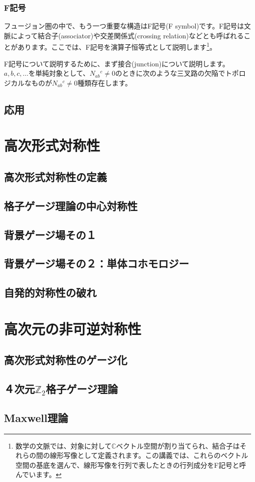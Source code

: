 \documentclass[report,paper=a4, fontsize=12pt, line_length=16cm, number_of_lines=33,dvipdfmx]{jlreq}
\numberwithin{equation}{chapter}
\newcommand{\Cb}{\mathbb{C}}
\newcommand{\Ztwo}{\mbox{$\mathbb{Z}_{2}$}}
\begin{document}
\subsection{F記号}
フュージョン圏の中で、もう一つ重要な構造はF記号(F symbol)です。F記号は文脈によって結合子(associator)や交差関係式(crossing relation)などとも呼ばれることがあります。ここでは、F記号を演算子恒等式として説明します\footnote{数学の文脈では、対象に対して$\Cb$ベクトル空間が割り当てられ、結合子はそれらの間の線形写像として定義されます。この講義では、これらのベクトル空間の基底を選んで、線形写像を行列で表したときの行列成分をF記号と呼んでいます。}。

F記号について説明するために、まず接合(junction)について説明します。$a,b,c,\dots$を単純対象として、$N_{ab}{}^{c}\ne 0$のときに次のような三叉路の欠陥でトポロジカルなものが$N_{ab}{}^{c}\ne 0$種類存在します。



\section{応用}


\chapter{高次形式対称性}
\section{高次形式対称性の定義}
\section{格子ゲージ理論の中心対称性}
\section{背景ゲージ場その１}
\section{背景ゲージ場その２：単体コホモロジー}
\section{自発的対称性の破れ}


\chapter{高次元の非可逆対称性}
\section{高次形式対称性のゲージ化}
\section{４次元\texorpdfstring{\Ztwo}{Z2}格子ゲージ理論}
\section{Maxwell理論}



\end{document}
